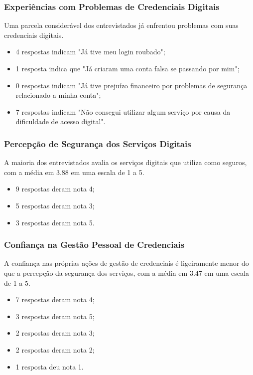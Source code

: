 \documentclass[12pt]{article}
\begin{document}
\subsubsection{Experiências com Problemas de Credenciais Digitais}

Uma parcela considerável dos entrevistados já enfrentou problemas com suas
credenciais digitais.

\begin{itemize}
  \item 4 respostas indicam "Já tive meu login roubado";
  \item 1 resposta indica que "Já criaram uma conta falsa se passando por mim";
  \item 0 respostas indicam "Já tive prejuízo financeiro por problemas de segurança
  relacionado a minha conta";
  \item 7 respostas indicam "Não consegui utilizar algum serviço por causa da
  dificuldade de acesso digital".
\end{itemize}

\subsubsection{Percepção de Segurança dos Serviços Digitais}

A maioria dos entrevistados avalia os serviços digitais que utiliza como seguros,
com a média em 3.88 em uma escala de 1 a 5.

\begin{itemize}
  \item 9 respostas deram nota 4;
  \item 5 respostas deram nota 3;
  \item 3 respostas deram nota 5.
\end{itemize}

\subsubsection{Confiança na Gestão Pessoal de Credenciais}

A confiança nas próprias ações de gestão de credenciais é ligeiramente menor do que a
percepção da segurança dos serviços, com a média em 3.47 em uma escala de 1 a 5.

\begin{itemize}
  \item 7 respostas deram nota 4;
  \item 3 respostas deram nota 5;
  \item 2 respostas deram nota 3;
  \item 2 respostas deram nota 2;
  \item 1 resposta deu nota 1.
\end{itemize}
\end{document}
